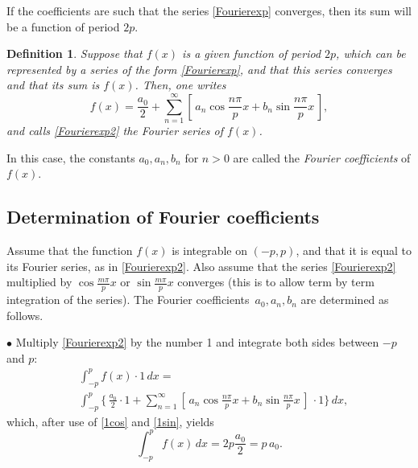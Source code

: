 \documentclass[12pt]{article}
\numberwithin{equation}{section}
\newtheorem{definition}[theorem]{Definition}
\newenvironment{Framed}
  	{\begin{framed}
  		}
  	{\end{framed}}
\begin{document}
If the coefficients are such that the series \eqref{Fourierexp} converges, then its sum will be a function of period $2p$. 

\begin{Framed}
\begin{definition}
\normalfont Suppose that $f(x)$ is a given function of period $2p$, which can be represented by a series of the form \eqref{Fourierexp}, and that this series converges and that its sum is $f(x)$. Then, one writes
\begin{equation}
 \label{Fourierexp2}
f(x)=\frac{a_0}{2}+\sum_{n=1}^{\infty} [\,a_n\cos \frac{n\pi}{p}x+
b_n\sin \frac{n\pi}{p}x\,],
\end{equation}
and calls \eqref{Fourierexp2} the  Fourier series of $f(x)$.
\end{definition}
\end{Framed}
In this case, the constants $a_0, a_n, b_n$ for $n>0$ are called the {\em Fourier coefficients} of $f(x)$.

\subsection{Determination of Fourier coefficients}
Assume that the function $f(x)$ is integrable on $(-p,p)$, and that it is 
equal to its Fourier series, as in \eqref{Fourierexp2}. Also assume that
the series \eqref{Fourierexp2} multiplied by $\cos \frac{m\pi}{p}x$ or
$\sin \frac{m\pi}{p}x$ converges (this is to allow term by term integration of the
series). The  Fourier coefficients \,$a_0,a_n,b_n$ are determined as follows.

$\bullet$ Multiply \eqref{Fourierexp2} by the number 1 and integrate both 
sides between $-p$ and $p$:
\begin{align*}
& \int_{-p}^p  f(x) \cdot  1 \,dx=\\
 &\int_{-p}^p   \{ \, \frac{a_0}{2} \cdot 1 +
\sum_{n=1}^{\infty}[\,a_n \cos \frac{n\pi}{p}x+b_n \sin \frac{n\pi}{p}x\,]
\, \cdot 1 \}\, dx,
\end{align*}
which, after use of \eqref{1cos} and \eqref{1sin}, yields
\[
\int_{-p}^p f(x)\,dx = 2p \frac{a_0}{2}=p\,a_0.
\]
\end{document}
